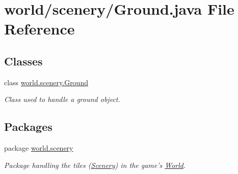 \hypertarget{a00066}{\section{world/scenery/\-Ground.java File Reference}
\label{a00066}
}
\subsection*{Classes}
\begin{DoxyCompactItemize}
\item 
class \hyperlink{a00012}{world.\-scenery.\-Ground}
\begin{DoxyCompactList}\small\item\em Class used to handle a ground object. \end{DoxyCompactList}\end{DoxyCompactItemize}
\subsection*{Packages}
\begin{DoxyCompactItemize}
\item 
package \hyperlink{a00091}{world.\-scenery}
\begin{DoxyCompactList}\small\item\em Package handling the tiles (\hyperlink{a00024}{Scenery}) in the game's \hyperlink{a00039}{World}. \end{DoxyCompactList}\end{DoxyCompactItemize}
